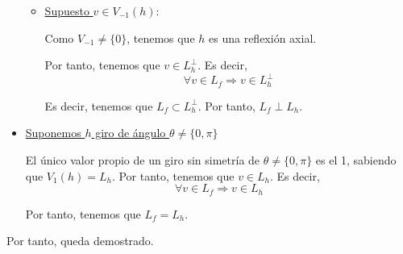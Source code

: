 \begin{ejercicio}
\begin{itemize}
\begin{itemize}
\begin{comment}
            Por tanto, tenemos que
            \end{comment}


            \item \underline{Supuesto $v\in V_{-1}(h)$}:

            Como $V_{-1}\neq \{0\}$, tenemos que $h$ es una reflexión axial.
            
            Por tanto, tenemos que $v\in L_h^\perp$. Es decir,
            \begin{equation*}
                \forall v\in L_f \Longrightarrow v\in L_h^\perp
            \end{equation*}
    
            Es decir, tenemos que $L_f \subset L_h^\perp$. Por tanto, $L_f\perp L_h$.
        \end{itemize}

        \item \underline{Suponemos $h$ giro de ángulo $\theta \neq \{0,\pi\}$}

        El único valor propio de un giro sin simetría de $\theta \neq \{0,\pi\}$ es el 1, sabiendo que $V_1(h)=L_h$. Por tanto, tenemos que $v\in L_h$. Es decir,
        \begin{equation*}
            \forall v\in L_f \Longrightarrow v\in L_h
        \end{equation*}

        Por tanto, tenemos que $L_f = L_h$.
    \end{itemize}

    Por tanto, queda demostrado.
\end{ejercicio}


